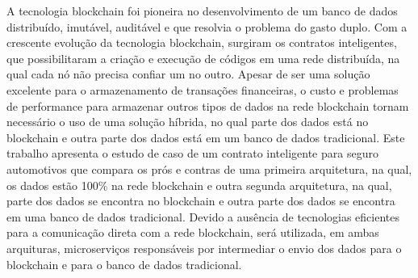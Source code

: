 A tecnologia blockchain foi pioneira no desenvolvimento de um banco de dados distribuído, imutável, auditável e que resolvia o problema do gasto duplo. Com a crescente evolução da tecnologia blockchain, surgiram os contratos inteligentes, que possibilitaram a criação e execução de códigos em uma rede distribuída, na qual cada nó não precisa confiar um no outro. Apesar de ser uma solução excelente para o armazenamento de transações financeiras, o custo e problemas de performance para armazenar outros tipos de dados na rede blockchain tornam necessário o uso de uma solução híbrida, no qual parte dos dados está no blockchain e outra parte dos dados está em um banco de dados tradicional. Este trabalho apresenta o estudo de caso de um contrato inteligente para seguro automotivos que compara os prós e contras de uma primeira arquitetura, na qual, os dados estão 100\% na rede blockchain e outra segunda arquitetura, na qual, parte dos dados se encontra no blockchain e outra parte dos dados se encontra em uma banco de dados tradicional. Devido a ausência de tecnologias eficientes para a comunicação direta com a rede blockchain, será utilizada, em ambas arquituras, microserviços responsáveis por intermediar o envio dos dados para o blockchain e para o banco de dados tradicional.